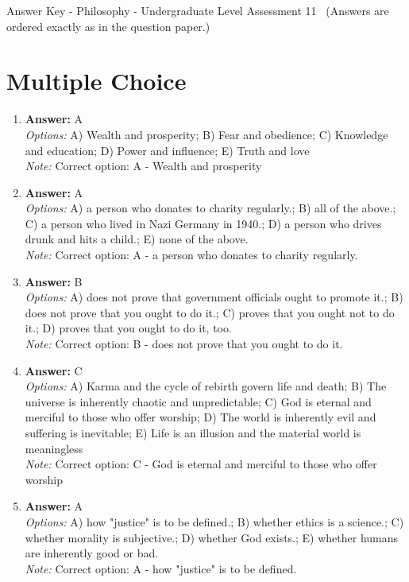 \documentclass[12pt]{article}
\begin{document}
\begin{center}
Answer Key - Philosophy - Undergraduate Level Assessment 11 \
\small (Answers are ordered exactly as in the question paper.)
\end{center}

\section*{Multiple Choice}
\begin{enumerate}[label=\arabic*.]
\item \textbf{Answer:} A
\\ \textit{Options:} A) Wealth and prosperity; B) Fear and obedience; C) Knowledge and education; D) Power and influence; E) Truth and love
\\ \textit{Note:} Correct option: A - Wealth and prosperity
\item \textbf{Answer:} A
\\ \textit{Options:} A) a person who donates to charity regularly.; B) all of the above.; C) a person who lived in Nazi Germany in 1940.; D) a person who drives drunk and hits a child.; E) none of the above.
\\ \textit{Note:} Correct option: A - a person who donates to charity regularly.
\item \textbf{Answer:} B
\\ \textit{Options:} A) does not prove that government officials ought to promote it.; B) does not prove that you ought to do it.; C) proves that you ought not to do it.; D) proves that you ought to do it, too.
\\ \textit{Note:} Correct option: B - does not prove that you ought to do it.
\item \textbf{Answer:} C
\\ \textit{Options:} A) Karma and the cycle of rebirth govern life and death; B) The universe is inherently chaotic and unpredictable; C) God is eternal and merciful to those who offer worship; D) The world is inherently evil and suffering is inevitable; E) Life is an illusion and the material world is meaningless
\\ \textit{Note:} Correct option: C - God is eternal and merciful to those who offer worship
\item \textbf{Answer:} A
\\ \textit{Options:} A) how "justice" is to be defined.; B) whether ethics is a science.; C) whether morality is subjective.; D) whether God exists.; E) whether humans are inherently good or bad.
\\ \textit{Note:} Correct option: A - how "justice" is to be defined.
\end{enumerate}
\end{document}
